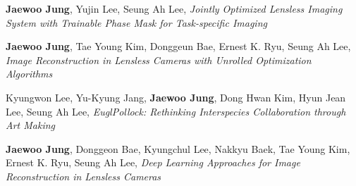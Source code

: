 \documentclass[a4paper,12pt]{memoir} %
\begin{document}
\clearpage %

\userinformation %

\framebreak %


\Sep %




{\textbf{Jaewoo Jung}, Yujin Lee, Seung Ah Lee, \textit{Jointly Optimized Lensless Imaging System with Trainable Phase Mask for Task-specific Imaging}}


{\textbf{Jaewoo Jung}, Tae Young Kim, Donggeun Bae, Ernest K. Ryu, Seung Ah Lee, \textit{Image Reconstruction in Lensless Cameras with Unrolled Optimization Algorithms}}



{Kyungwon Lee, Yu-Kyung Jang, \textbf{Jaewoo Jung}, Dong Hwan Kim, Hyun Jean Lee, Seung Ah Lee, \textit{EuglPollock: Rethinking Interspecies Collaboration through Art Making}}




{\textbf{Jaewoo Jung}, Donggeon Bae, Kyungchul Lee, Nakkyu Baek, Tae Young Kim, Ernest K. Ryu, Seung Ah Lee, \textit{Deep Learning Approaches for Image Reconstruction in Lensless Cameras}}



\end{document}
